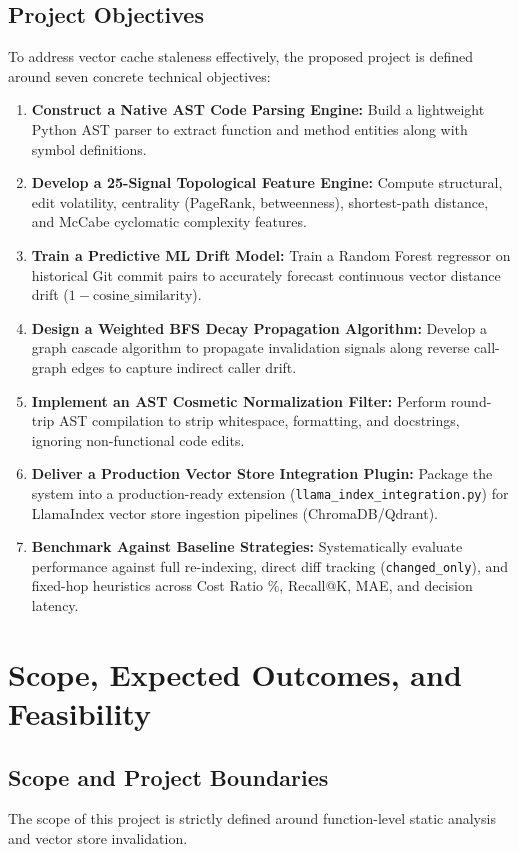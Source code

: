 \documentclass[conference]{IEEEtran}
\begin{document}
\subsection{Project Objectives}
To address vector cache staleness effectively, the proposed project is defined around seven concrete technical objectives:
\begin{enumerate}
    \item \textbf{Construct a Native AST Code Parsing Engine:} Build a lightweight Python AST parser to extract function and method entities along with symbol definitions.
    \item \textbf{Develop a 25-Signal Topological Feature Engine:} Compute structural, edit volatility, centrality (PageRank, betweenness), shortest-path distance, and McCabe cyclomatic complexity features.
    \item \textbf{Train a Predictive ML Drift Model:} Train a Random Forest regressor on historical Git commit pairs to accurately forecast continuous vector distance drift ($1 - \text{cosine\_similarity}$).
    \item \textbf{Design a Weighted BFS Decay Propagation Algorithm:} Develop a graph cascade algorithm to propagate invalidation signals along reverse call-graph edges to capture indirect caller drift.
    \item \textbf{Implement an AST Cosmetic Normalization Filter:} Perform round-trip AST compilation to strip whitespace, formatting, and docstrings, ignoring non-functional code edits.
    \item \textbf{Deliver a Production Vector Store Integration Plugin:} Package the system into a production-ready extension (\texttt{llama\_index\_integration.py}) for LlamaIndex vector store ingestion pipelines (ChromaDB/Qdrant).
    \item \textbf{Benchmark Against Baseline Strategies:} Systematically evaluate performance against full re-indexing, direct diff tracking (\texttt{changed\_only}), and fixed-hop heuristics across Cost Ratio \%, Recall@K, MAE, and decision latency.
\end{enumerate}

\section{Scope, Expected Outcomes, and Feasibility}

\subsection{Scope and Project Boundaries}
The scope of this project is strictly defined around function-level static analysis and vector store invalidation.
\end{document}
